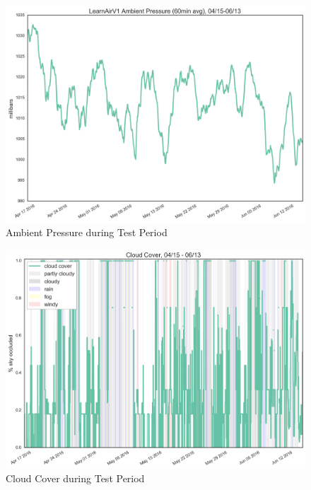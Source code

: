 \begin{figure}[htb]
 	\includegraphics[width=\textwidth]{figs/ambient_pressure}               
 	 \caption{Ambient Pressure during Test Period}
  	\label{fig:ambient_pressure}
\end{figure}

\begin{figure}[htb]
 	\includegraphics[width=\textwidth]{figs/cloud_cover}               
 	 \caption{Cloud Cover during Test Period}
  	\label{fig:cloud_cover}
\end{figure}

